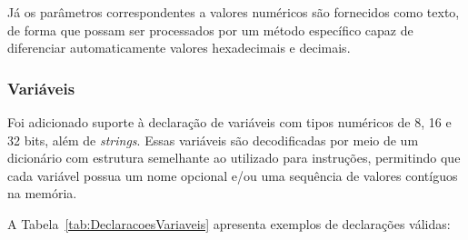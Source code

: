 \documentclass[
	12pt,				%
	openright,			%
	oneside,			%
	a4paper,			%
	english,			%
	french,				%
	spanish,			%
	brazil,				%
	]{abntex2}
\begin{document}
Já os parâmetros correspondentes a valores numéricos são fornecidos como texto, de forma que possam ser processados por um método específico capaz de diferenciar automaticamente valores hexadecimais e decimais.

\subsubsection{Variáveis}

Foi adicionado suporte à declaração de variáveis com tipos numéricos de 8, 16 e 32 bits, além de \textit{strings}. Essas variáveis são decodificadas por meio de um dicionário com estrutura semelhante ao utilizado para instruções, permitindo que cada variável possua um nome opcional e/ou uma sequência de valores contíguos na memória.

A Tabela~\ref{tab:DeclaracoesVariaveis} apresenta exemplos de declarações válidas:
\end{document}
